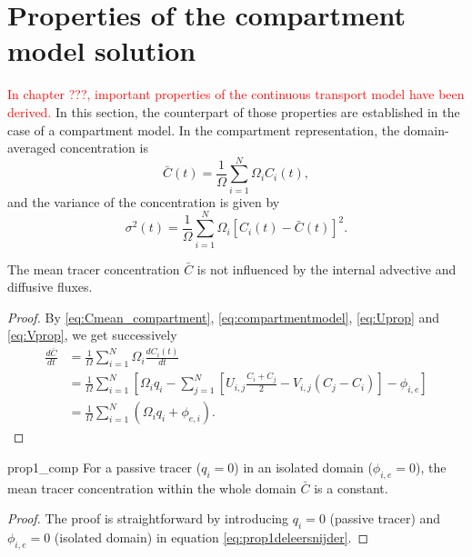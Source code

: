 \section{Properties of the compartment model solution} \label{sec:prop_comp}
\textcolor{red}{In chapter ???, important properties of the continuous transport model have been derived.} In this section, the counterpart of those properties are established in the case of a compartment model. In the compartment representation, the domain-averaged concentration is
\begin{equation} \label{eq:Cmean_compartment}
	\bar{C}(t) = \frac{1}{\Omega} \sum_{i=1}^N \Omega_i C_i(t),
\end{equation}
and the variance of the concentration is given by
\begin{equation}
	\sigma^2(t) = \frac{1}{\Omega} \sum_{i=1}^{N} \Omega_i \left[C_i(t) - \bar{C}(t)\right]^2.
\end{equation}

\begin{property} \label{prop1_comp}
	The mean tracer concentration $\bar C$ is not influenced by the internal advective and diffusive fluxes.
\end{property}
\begin{proof}
	By \eqref{eq:Cmean_compartment}, \eqref{eq:compartmentmodel}, \eqref{eq:Uprop} and \eqref{eq:Vprop}, we get successively
	\begin{subequations}
	\begin{align}
		\frac{d\bar{C}}{dt} &= \frac{1}{\Omega} \sum_{i=1}^N \Omega_i \frac{dC_i(t)}{dt}\\
			&= \frac{1}{\Omega} \sum_{i=1}^N \left[\Omega_i q_i - \sum_{j=1}^N \left[ U_{i,j}\frac{C_i + C_j}{2} - V_{i,j} (C_j-C_i)\right] - \phi_{i,e} \right]\\
			&= \frac{1}{\Omega} \sum_{i=1}^N(\Omega_i q_i + \phi_{e,i}). \label{eq:prop1deleersnijder}
	\end{align}
	\end{subequations}
\end{proof}

\begin{corollary}{prop1_comp}
	For a passive tracer ($q_i = 0$) in an isolated domain ($\phi_{i,e} = 0$), the mean tracer concentration within the whole domain $\bar C$ is a constant.
\end{corollary}
\begin{proof}
	The proof is straightforward by introducing $q_i = 0$ (passive tracer) and $\phi_{i,e} = 0$ (isolated domain) in equation \eqref{eq:prop1deleersnijder}.	
\end{proof}

